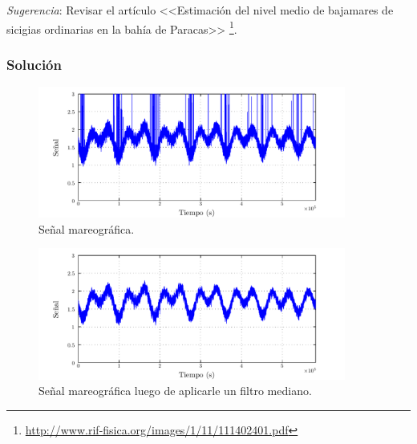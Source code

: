 \documentclass[a4paper,12pt,final]{article}
\begin{document}
      \noindent \emph{Sugerencia}: Revisar el artículo <<Estimación del nivel medio de bajamares de sicigias ordinarias en la bahía de Paracas>>
      \footnote{\url{http://www.rif-fisica.org/images/1/11/111402401.pdf}}.

    \subsubsection*{Solución}
      \vfill

      \newpage
      \begin{figure}[H]
        \begin{center}
          \caption{Señal mareográfica.}
          \label{p3f1}
          \vspace{-1em}
          \includegraphics[width=0.9\textwidth]{./laboratorio_5/problema03_signal.pdf}
        \end{center}
      \end{figure}

      \begin{figure}[H]
        \begin{center}
          \caption{Señal mareográfica luego de aplicarle un filtro mediano.}
          \label{p3f2}
          \vspace{-1em}
          \includegraphics[width=0.9\textwidth]{./laboratorio_5/problema03_signal_median_filter.pdf}
        \end{center}
      \end{figure}
\end{document}
